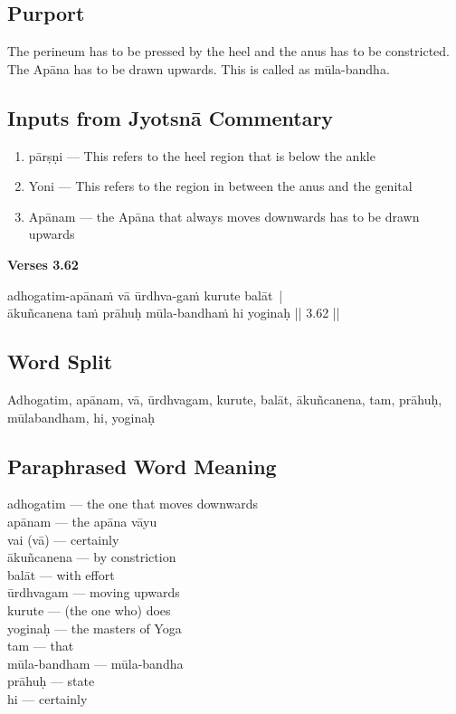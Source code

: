 \subsection*{Purport}

The perineum has to be pressed by the heel and the anus has to be constricted. The Apāna has to be drawn upwards. This is called as mūla-bandha.

\subsection*{Inputs from Jyotsnā Commentary}

\begin{enumerate}
\item pārṣṇi --- This refers to the heel region that is below the ankle
\item Yoni --- This refers to the region in between the anus and the genital  
\item Apānam --- the Apāna that always moves downwards has to be drawn upwards 
\end{enumerate}

\noindent \textbf{Verses 3.62}

\begin{shloka}
adhogatim-apānaṁ vā ūrdhva-gaṁ kurute balāt |\\
ākuñcanena taṁ prāhuḥ mūla-bandhaṁ hi yoginaḥ || 3.62 ||
\end{shloka}

\subsection*{Word Split}

Adhogatim, apānam, vā, ūrdhvagam, kurute, balāt, ākuñcanena, tam, prāhuḥ, mūlabandham, hi, yoginaḥ

\subsection*{Paraphrased Word Meaning}

\begin{multicols}{2}
adhogatim --- the one that moves downwards \\
apānam ---  the apāna vāyu\\
vai (vā) ---  certainly \\
ākuñcanena --- by constriction  \\
balāt --- with effort \\
ūrdhvagam --- moving upwards \\
kurute --- (the one who) does  \\
yoginaḥ --- the masters of Yoga\\
tam --- that  \\
mūla-bandham ---  mūla-bandha\\
prāhuḥ --- state\\
hi --- certainly 
\end{multicols}

